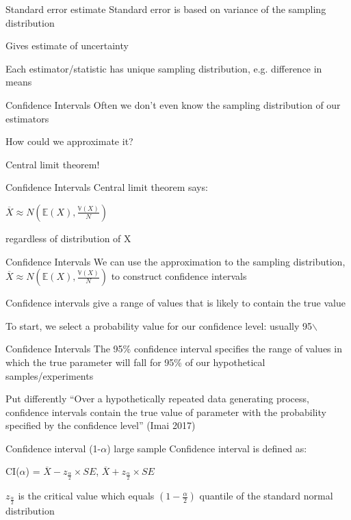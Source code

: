 \documentclass[presentation]{beamer}
\newcommand{\E}{\mathbb{E}}
\newcommand{\V}{\mathbb{V}}
\begin{document}
\begin{frame}[label={sec:org5ac2971}]{Standard error estimate}
Standard error is based on variance of the sampling distribution

Gives estimate of uncertainty

Each estimator/statistic has unique sampling distribution, e.g. difference in means
\end{frame}

\begin{frame}[label={sec:org2bf089a}]{Confidence Intervals}
Often we don't even know the sampling distribution of our estimators

How could we approximate it?


\pause
\alert{Central limit theorem!}
\end{frame}


\begin{frame}[label={sec:org8df1c8d}]{Confidence Intervals}
Central limit theorem says:

\(\overline{X} \approx N(\E(X), \frac{\V(X)}{N})\)

\alert{regardless of distribution of X}
\end{frame}


\begin{frame}[label={sec:org836f54e}]{Confidence Intervals}
We can use the approximation to the sampling distribution, \(\overline{X} \approx N(\E(X), \frac{\V(X)}{N})\) to construct \alert{confidence intervals}

Confidence intervals give a range of values that is likely to contain the true value

\pause
To start, we select a probability value for our confidence level: usually 95$\backslash$%
\end{frame}

\begin{frame}[label={sec:org7c01b19}]{Confidence Intervals}
\alert{The 95\% confidence interval specifies the range of values in which the true parameter will fall for 95\% of our hypothetical samples/experiments}

\pause

Put differently
\alert{``Over a hypothetically repeated data generating process, confidence intervals contain the true value of parameter with the probability specified by the confidence level''} (Imai 2017)
\end{frame}


\begin{frame}[label={sec:orgb13044c}]{Confidence interval}
(1-\(\alpha\)) large sample Confidence interval is defined as:

CI(\(\alpha\)) = \(\overline{X} - z_{\frac{\alpha}{2}} \times SE\),  \(\overline{X} + z_{\frac{\alpha}{2}} \times SE\)

\(z_{\frac{\alpha}{2}}\) is the critical value which equals \((1 − \frac{\alpha}{2})\) quantile of the standard normal distribution
\end{frame}
\end{document}
